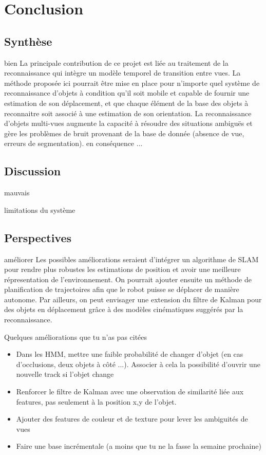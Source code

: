 \chapter{Conclusion}

\section{Synthèse}  bien
La principale contribution de ce projet est liée au traitement de la reconnaissance qui intègre un modèle temporel de transition entre vues. La méthode proposée ici pourrait être mise en place pour n'importe quel système de reconnaissance d'objets à condition qu'il soit mobile et capable de fournir une estimation de son déplacement, et que chaque élément de la base des objets à reconnaitre soit associé à une estimation de son orientation. La reconnaissance d'objets multi-vues augmente la capacité à résoudre des situations ambiguës et gère les problèmes de bruit provenant de la base de donnée (absence de vue, erreurs de segmentation). en conséquence ...

\section{Discussion} mauvais

limitations du système

\section{Perspectives} améliorer
Les possibles améliorations seraient d'intégrer un algorithme de SLAM pour rendre plus robustes les estimations de position et avoir une meilleure répresentation de l'environnement. On pourrait ajouter ensuite un méthode de planification de trajectoires afin que le robot puisse se déplacer de manière autonome. Par ailleurs, on peut envisager une extension du filtre de Kalman pour des objets en déplacement grâce à des modèles cinématiques suggérés par la reconnaissance.

\color[rgb]{1,0,0}
{
Quelques améliorations que tu n'as pas citées
\begin{itemize}
\item Dans les HMM, mettre une faible probabilité de changer d'objet (en cas d'occlusions, deux objets à côté ...). Associer à cela la possibilité d'ouvrir une nouvelle track si l'objet change
\item Renforcer le filtre de Kalman avec une observation de similarité liée aux features, pas seulement à la position x,y de l'objet.
\item Ajouter des features de couleur et de texture pour lever les ambiguités de vues
\item Faire une base incrémentale (a moins que tu ne la fasse la semaine prochaine)
\end{itemize}
 }
\color[rgb]{0,0,0}






